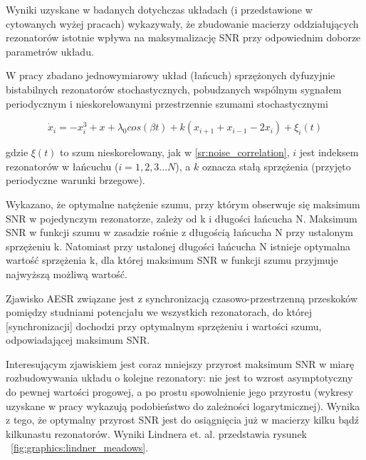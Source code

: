   Wyniki uzyskane w badanych dotychczas układach (i przedstawione w cytowanych wyżej pracach) wykazywały, że zbudowanie macierzy oddziałujących rezonatorów istotnie wpływa na maksymalizację SNR przy odpowiednim doborze parametrów układu.

  W pracy \cite{lindner_meadows} zbadano jednowymiarowy układ (łańcuch) sprzężonych dyfuzyjnie bistabilnych rezonatorów stochastycznych, pobudzanych wspólnym sygnałem periodycznym i nieskorelowanymi przestrzennie szumami stochastycznymi

  \begin{equation}
    \dot x_i = -x_i^3 + x + \lambda_0 cos(\beta t) + k(x_{i+1} + x_{i-1} -2 x_{i}) + \xi_i (t)
  \end{equation}

  gdzie $\xi(t)$ to szum nieskorelowany, jak w \ref{sr:noise_correlation}, $i$ jest indeksem rezonatorów w łańcuchu ($ i = 1,2,3...N$), a $k$ oznacza stałą sprzężenia (przyjęto periodyczne warunki brzegowe).

  Wykazano, że optymalne natężenie szumu, przy którym obserwuje się maksimum SNR w pojedynczym rezonatorze, zależy od k i długości łańcucha N. Maksimum SNR w funkcji szumu w zasadzie rośnie z długością łańcucha N przy ustalonym sprzężeniu k. Natomiast przy ustalonej długości łańcucha N istnieje optymalna wartość sprzężenia k, dla której maksimum SNR w funkcji szumu przyjmuje najwyższą możliwą wartość.

  Zjawisko AESR związane jest z synchronizacją czasowo-przestrzenną przeskoków pomiędzy studniami potencjału we wszystkich rezonatorach, do której [synchronizacji] dochodzi przy optymalnym sprzężeniu i wartości szumu, odpowiadającej maksimum SNR.

  Interesującym zjawiskiem jest coraz mniejszy przyrost maksimum SNR w miarę rozbudowywania układu o kolejne rezonatory: nie jest to wzrost asymptotyczny do pewnej wartości progowej, a po prostu spowolnienie jego przyrostu (wykresy uzyskane w pracy \cite{lindner_meadows} wykazują podobieństwo do zależności logarytmicznej). Wynika z tego, że optymalny przyrost SNR jest do osiągnięcia już w macierzy kilku bądź kilkunastu rezonatorów. Wyniki Lindnera et. al. \cite{lindner_meadows} przedstawia rysunek ~\ref{fig:graphics:lindner_meadows}.

